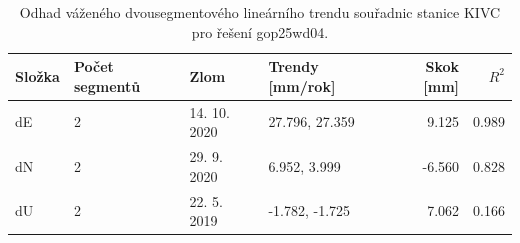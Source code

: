 \begin{table}[H]
\centering
\small
\caption{Odhad váženého dvousegmentového lineárního trendu souřadnic stanice KIVC pro řešení gop25wd04.}
\label{tab:gop25wd04_stcd_kivc_trend_weighted_2seg}
\begin{tabular}{llllrr}
\toprule
Složka & Počet segmentů & Zlom & Trendy [mm/rok] & Skok [mm] & $R^2$ \\
\midrule
dE & 2 & 14. 10. 2020 & 27.796, 27.359 & 9.125 & 0.989 \\
dN & 2 & 29. 9. 2020 & 6.952, 3.999 & -6.560 & 0.828 \\
dU & 2 & 22. 5. 2019 & -1.782, -1.725 & 7.062 & 0.166 \\
\bottomrule
\end{tabular}
\end{table}
